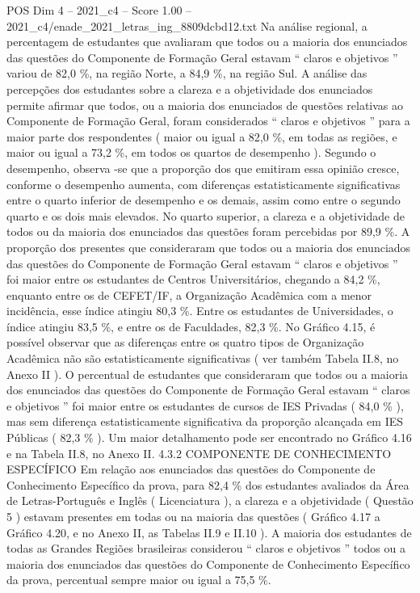 \begin{textsample}{POS Dim 4 – 2021\_c4 – Score 1.00 – 2021\_c4/enade\_2021\_letras\_ing\_8809dcbd12.txt}
Na análise regional, a percentagem de estudantes que avaliaram que todos ou a maioria dos enunciados das questões do Componente de Formação Geral estavam “ claros e objetivos ” variou de 82,0 \%, na região Norte, a 84,9 \%, na região Sul.
A análise das percepções dos estudantes sobre a clareza e a objetividade dos enunciados permite afirmar que todos, ou a maioria dos enunciados de questões relativas ao Componente de Formação Geral, foram considerados “ claros e objetivos ” para a maior parte dos respondentes ( maior ou igual a 82,0 \%, em todas as regiões, e maior ou igual a 73,2 \%, em todos os quartos de desempenho ).
Segundo o desempenho, observa -se que a proporção dos que emitiram essa opinião cresce, conforme o desempenho aumenta, com diferenças estatisticamente significativas entre o quarto inferior de desempenho e os demais, assim como entre o segundo quarto e os dois mais elevados.
No quarto superior, a clareza e a objetividade de todos ou da maioria dos enunciados das questões foram percebidas por 89,9 \%.
A proporção dos presentes que consideraram que todos ou a maioria dos enunciados das questões do Componente de Formação Geral estavam “ claros e objetivos ” foi maior entre os estudantes de Centros Universitários, chegando a 84,2 \%, enquanto entre os de CEFET/IF, a Organização Acadêmica com a menor incidência, esse índice atingiu 80,3 \%.
Entre os estudantes de Universidades, o índice atingiu 83,5 \%, e entre os de Faculdades, 82,3 \%.
No Gráfico 4.15, é possível observar que as diferenças entre os quatro tipos de Organização Acadêmica não são estatisticamente significativas ( ver também Tabela II.8, no Anexo II ).
O percentual de estudantes que consideraram que todos ou a maioria dos enunciados das questões do Componente de Formação Geral estavam “ claros e objetivos ” foi maior entre os estudantes de cursos de IES Privadas ( 84,0 \% ), mas sem diferença estatisticamente significativa da proporção alcançada em IES Públicas ( 82,3 \% ).
Um maior detalhamento pode ser encontrado no Gráfico 4.16 e na Tabela II.8, no Anexo II. 4.3.2 COMPONENTE DE CONHECIMENTO ESPECÍFICO Em relação aos enunciados das questões do Componente de Conhecimento Específico da prova, para 82,4 \% dos estudantes avaliados da Área de Letras-Português e Inglês ( Licenciatura ), a clareza e a objetividade ( Questão 5 ) estavam presentes em todas ou na maioria das questões ( Gráfico 4.17 a Gráfico 4.20, e no Anexo II, as Tabelas II.9 e II.10 ).
A maioria dos estudantes de todas as Grandes Regiões brasileiras considerou “ claros e objetivos ” todos ou a maioria dos enunciados das questões do Componente de Conhecimento Específico da prova, percentual sempre maior ou igual a 75,5 \%.

\end{textsample}
